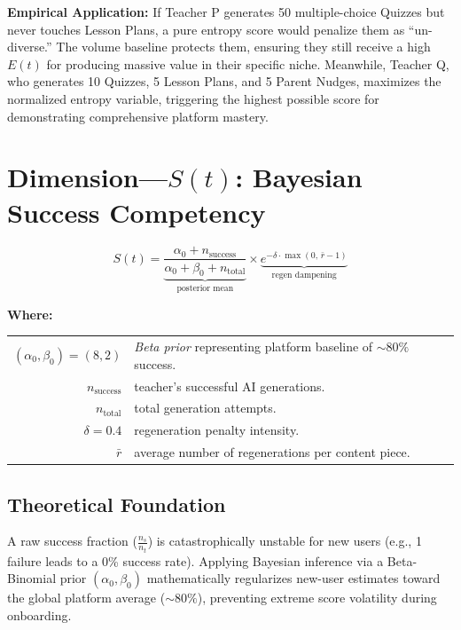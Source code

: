 \documentclass[11pt,a4paper]{article}
\begin{document}
\textbf{Empirical Application:}
If Teacher P generates 50 multiple-choice Quizzes but never touches Lesson Plans, a pure entropy score would penalize them as ``un-diverse.'' The volume baseline protects them, ensuring they still receive a high $E(t)$ for producing massive value in their specific niche. Meanwhile, Teacher Q, who generates 10 Quizzes, 5 Lesson Plans, and 5 Parent Nudges, maximizes the normalized entropy variable, triggering the highest possible score for demonstrating comprehensive platform mastery.

\section{Dimension---$S(t)$: Bayesian Success Competency}

\begin{equation}
    S(t) = \underbrace{\frac{\alpha_0 + n_{\text{success}}}{\alpha_0 + \beta_0 + n_{\text{total}}}}_{\text{posterior mean}} \times \underbrace{e^{-\delta \cdot \max(0,\, \bar{r} - 1)}}_{\text{regen dampening}}
\end{equation}

\noindent \textbf{Where:}

\vspace{0.25em}
\noindent
\begin{tabular}{@{} r p{11cm} @{}}
    $(\alpha_0, \beta_0) = (8, 2)$ & \textit{Beta prior} representing platform baseline of $\sim 80\%$ success. \\
    $n_{\text{success}}$ & teacher's successful AI generations. \\
    $n_{\text{total}}$ & total generation attempts. \\
    $\delta = 0.4$ & regeneration penalty intensity. \\
    $\bar{r}$ & average number of regenerations per content piece. \\
\end{tabular}

\subsection{Theoretical Foundation}
A raw success fraction ($\frac{n_s}{n_t}$) is catastrophically unstable for new users (e.g., 1 failure leads to a 0\% success rate). Applying Bayesian inference via a Beta-Binomial prior $(\alpha_0, \beta_0)$ mathematically regularizes new-user estimates toward the global platform average ($\sim 80\%$), preventing extreme score volatility during onboarding.
\end{document}
